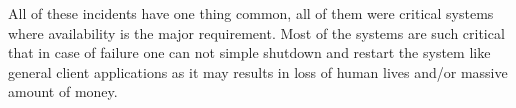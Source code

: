 All of these incidents have one thing common, all of them were critical systems
where availability is the major requirement. Most of the systems are such
critical that in case of failure one can not simple shutdown and restart the
system like general client applications as it may results in loss of human lives
and/or massive amount of money.







